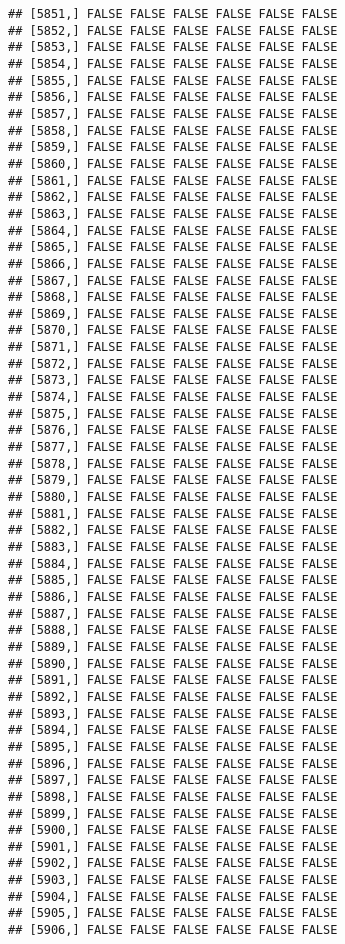 \documentclass[
]{article}
\begin{document}
\begin{verbatim}
## [5851,] FALSE FALSE FALSE FALSE FALSE FALSE
## [5852,] FALSE FALSE FALSE FALSE FALSE FALSE
## [5853,] FALSE FALSE FALSE FALSE FALSE FALSE
## [5854,] FALSE FALSE FALSE FALSE FALSE FALSE
## [5855,] FALSE FALSE FALSE FALSE FALSE FALSE
## [5856,] FALSE FALSE FALSE FALSE FALSE FALSE
## [5857,] FALSE FALSE FALSE FALSE FALSE FALSE
## [5858,] FALSE FALSE FALSE FALSE FALSE FALSE
## [5859,] FALSE FALSE FALSE FALSE FALSE FALSE
## [5860,] FALSE FALSE FALSE FALSE FALSE FALSE
## [5861,] FALSE FALSE FALSE FALSE FALSE FALSE
## [5862,] FALSE FALSE FALSE FALSE FALSE FALSE
## [5863,] FALSE FALSE FALSE FALSE FALSE FALSE
## [5864,] FALSE FALSE FALSE FALSE FALSE FALSE
## [5865,] FALSE FALSE FALSE FALSE FALSE FALSE
## [5866,] FALSE FALSE FALSE FALSE FALSE FALSE
## [5867,] FALSE FALSE FALSE FALSE FALSE FALSE
## [5868,] FALSE FALSE FALSE FALSE FALSE FALSE
## [5869,] FALSE FALSE FALSE FALSE FALSE FALSE
## [5870,] FALSE FALSE FALSE FALSE FALSE FALSE
## [5871,] FALSE FALSE FALSE FALSE FALSE FALSE
## [5872,] FALSE FALSE FALSE FALSE FALSE FALSE
## [5873,] FALSE FALSE FALSE FALSE FALSE FALSE
## [5874,] FALSE FALSE FALSE FALSE FALSE FALSE
## [5875,] FALSE FALSE FALSE FALSE FALSE FALSE
## [5876,] FALSE FALSE FALSE FALSE FALSE FALSE
## [5877,] FALSE FALSE FALSE FALSE FALSE FALSE
## [5878,] FALSE FALSE FALSE FALSE FALSE FALSE
## [5879,] FALSE FALSE FALSE FALSE FALSE FALSE
## [5880,] FALSE FALSE FALSE FALSE FALSE FALSE
## [5881,] FALSE FALSE FALSE FALSE FALSE FALSE
## [5882,] FALSE FALSE FALSE FALSE FALSE FALSE
## [5883,] FALSE FALSE FALSE FALSE FALSE FALSE
## [5884,] FALSE FALSE FALSE FALSE FALSE FALSE
## [5885,] FALSE FALSE FALSE FALSE FALSE FALSE
## [5886,] FALSE FALSE FALSE FALSE FALSE FALSE
## [5887,] FALSE FALSE FALSE FALSE FALSE FALSE
## [5888,] FALSE FALSE FALSE FALSE FALSE FALSE
## [5889,] FALSE FALSE FALSE FALSE FALSE FALSE
## [5890,] FALSE FALSE FALSE FALSE FALSE FALSE
## [5891,] FALSE FALSE FALSE FALSE FALSE FALSE
## [5892,] FALSE FALSE FALSE FALSE FALSE FALSE
## [5893,] FALSE FALSE FALSE FALSE FALSE FALSE
## [5894,] FALSE FALSE FALSE FALSE FALSE FALSE
## [5895,] FALSE FALSE FALSE FALSE FALSE FALSE
## [5896,] FALSE FALSE FALSE FALSE FALSE FALSE
## [5897,] FALSE FALSE FALSE FALSE FALSE FALSE
## [5898,] FALSE FALSE FALSE FALSE FALSE FALSE
## [5899,] FALSE FALSE FALSE FALSE FALSE FALSE
## [5900,] FALSE FALSE FALSE FALSE FALSE FALSE
## [5901,] FALSE FALSE FALSE FALSE FALSE FALSE
## [5902,] FALSE FALSE FALSE FALSE FALSE FALSE
## [5903,] FALSE FALSE FALSE FALSE FALSE FALSE
## [5904,] FALSE FALSE FALSE FALSE FALSE FALSE
## [5905,] FALSE FALSE FALSE FALSE FALSE FALSE
## [5906,] FALSE FALSE FALSE FALSE FALSE FALSE

\end{verbatim}
\end{document}
